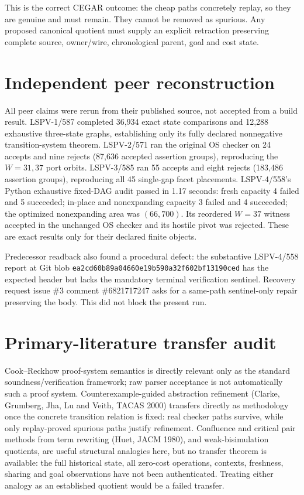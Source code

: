 \documentclass[11pt]{article}
\begin{document}
This is the correct CEGAR outcome: the cheap paths concretely replay, so they
are genuine and must remain.  They cannot be removed as spurious.  Any proposed
canonical quotient must supply an explicit retraction preserving complete
source, owner/wire, chronological parent, goal and cost state.

\section*{Independent peer reconstruction}
All peer claims were rerun from their published source, not accepted from a
build result.  LSPV-1/587 completed 36,934 exact state comparisons and 12,288
exhaustive three-state graphs, establishing only its fully declared
nonnegative transition-system theorem.  LSPV-2/571 ran the original OS checker
on 24 accepts and nine rejects (87,636 accepted assertion groups), reproducing
the $W=31,37$ port orbits.  LSPV-3/585 ran 55 accepts and eight rejects
(183,486 assertion groups), reproducing all 45 single-gap facet placements.
LSPV-4/558's Python exhaustive fixed-DAG audit passed in 1.17 seconds: fresh
capacity 4 failed and 5 succeeded; in-place and nonexpanding capacity 3 failed
and 4 succeeded; the optimized nonexpanding area was $(66,700)$.  Its reordered
$W=37$ witness accepted in the unchanged OS checker and its hostile pivot was
rejected.  These are exact results only for their declared finite objects.

Predecessor readback also found a procedural defect: the substantive
LSPV-4/558 report at Git blob
\texttt{ea2cd60b89a04660e19b590a32f602bf13190ced} has the expected header but
lacks the mandatory terminal verification sentinel.  Recovery request issue
\#3 comment \#6821717247 asks for a same-path sentinel-only repair preserving
the body.  This did not block the present run.

\section*{Primary-literature transfer audit}
Cook--Reckhow proof-system semantics is directly relevant only as the standard
soundness/verification framework; raw parser acceptance is not automatically
such a proof system.  Counterexample-guided abstraction refinement (Clarke,
Grumberg, Jha, Lu and Veith, TACAS 2000) transfers directly as methodology once
the concrete transition relation is fixed: real checker paths survive, while
only replay-proved spurious paths justify refinement.  Confluence and critical
pair methods from term rewriting (Huet, JACM 1980), and weak-bisimulation
quotients, are useful structural analogies here, but no transfer theorem is
available: the full historical state, all zero-cost operations, contexts,
freshness, sharing and goal observations have not been authenticated.  Treating
either analogy as an established quotient would be a failed transfer.
\end{document}

